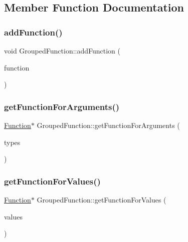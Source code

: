 \subsection{Member Function Documentation}
\mbox{\label{classGroupedFunction_ab019d13e239da992fc6fbe01bc5be8ef}} 
\subsubsection{\texorpdfstring{add\+Function()}{addFunction()}}
{\footnotesize\ttfamily void Grouped\+Function\+::add\+Function (\begin{DoxyParamCaption}\item[{std\+::unique\+\_\+ptr$<$ \hyperlink{classFunction}{Function} $>$}]{function }\end{DoxyParamCaption})}

\mbox{\label{classGroupedFunction_a4aa6efd8e1ec521964b7826249458f27}} 
\subsubsection{\texorpdfstring{get\+Function\+For\+Arguments()}{getFunctionForArguments()}}
{\footnotesize\ttfamily \hyperlink{classFunction}{Function}$\ast$ Grouped\+Function\+::get\+Function\+For\+Arguments (\begin{DoxyParamCaption}\item[{std\+::vector$<$ \hyperlink{classVarType}{Var\+Type} $>$}]{types }\end{DoxyParamCaption})}

\mbox{\label{classGroupedFunction_a216ffc5f08fe1bc61968f4a5f5e99b49}} 
\subsubsection{\texorpdfstring{get\+Function\+For\+Values()}{getFunctionForValues()}}
{\footnotesize\ttfamily \hyperlink{classFunction}{Function}$\ast$ Grouped\+Function\+::get\+Function\+For\+Values (\begin{DoxyParamCaption}\item[{std\+::vector$<$ \hyperlink{classValue}{Value} $>$}]{values }\end{DoxyParamCaption})}

